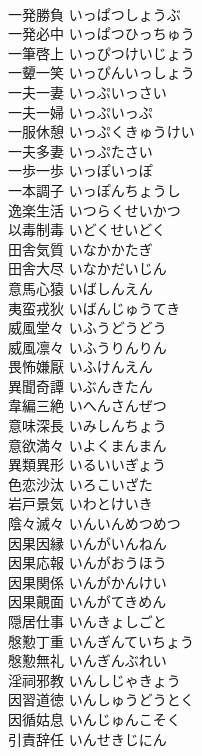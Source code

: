 \documentclass[8pt]{extreport}
\begin{document}
\begin{CJK}{UTF8}{min}
\\	一発勝負	いっぱつしょうぶ	
\\	一発必中	いっぱつひっちゅう	
\\	一筆啓上	いっぴつけいじょう	
\\	一顰一笑	いっぴんいっしょう	
\\	一夫一妻	いっぷいっさい	
\\	一夫一婦	いっぷいっぷ	
\\	一服休憩	いっぷくきゅうけい	
\\	一夫多妻	いっぷたさい	
\\	一歩一歩	いっぽいっぽ	
\\	一本調子	いっぽんちょうし	
\\	逸楽生活	いつらくせいかつ	
\\	以毒制毒	いどくせいどく	
\\	田舎気質	いなかかたぎ	
\\	田舎大尽	いなかだいじん	
\\	意馬心猿	いばしんえん	
\\	夷蛮戎狄	いばんじゅうてき	
\\	威風堂々	いふうどうどう	
\\	威風凛々	いふうりんりん	
\\	畏怖嫌厭	いふけんえん	
\\	異聞奇譚	いぶんきたん	
\\	韋編三絶	いへんさんぜつ	
\\	意味深長	いみしんちょう	
\\	意欲満々	いよくまんまん	
\\	異類異形	いるいいぎょう	
\\	色恋沙汰	いろこいざた	
\\	岩戸景気	いわとけいき	
\\	陰々滅々	いんいんめつめつ	
\\	因果因縁	いんがいんねん	
\\	因果応報	いんがおうほう	
\\	因果関係	いんがかんけい	
\\	因果覿面	いんがてきめん	
\\	隠居仕事	いんきょしごと	
\\	慇懃丁重	いんぎんていちょう	
\\	慇懃無礼	いんぎんぶれい	
\\	淫祠邪教	いんしじゃきょう	
\\	因習道徳	いんしゅうどうとく	
\\	因循姑息	いんじゅんこそく	
\\	引責辞任	いんせきじにん	

\end{CJK}
\end{document}
